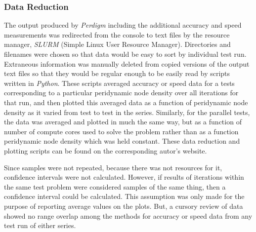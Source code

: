 \documentclass[preprint,12pt]{elsarticle}
\begin{document}
\subsubsection{Data Reduction} 
The output produced by \emph{Perdigm} including the additional accuracy and speed measurements was redirected from the console to text files by the resource manager, \emph{SLURM} (Simple Linux User Resource Manager).  Directories and filenames were chosen so that data would be easy to sort by individual test run.  Extraneous information was manually deleted from copied versions of the output text files so that they would be regular enough to be easily read by scripts written in \emph{Python}. These scripts averaged accuracy or speed data for a tests corresponding to a particular peridynamic node density over all iterations for that run, and then plotted this averaged data  as a function of peridynamic node density as it varied from test to test in the series.  Similarly, for the parallel tests, the data was averaged and plotted in much the same way, but as a function of number of compute cores used to solve the problem rather than as a function peridynamic node density which was held constant. These data reduction and plotting scripts can be found on the corresponding autor's website.

Since samples were not repeated, because there was not resources for it, confidence intervals were not calculated. However, if results of iterations within the same test problem were considered samples of the same thing, then a confidence interval could be calculated. This assumption was only made for the purpose of reporting average values on the plots. But, a cursory review of data showed no range overlap among the methods for accuracy or speed data from any test run of either series. 
\end{document}
